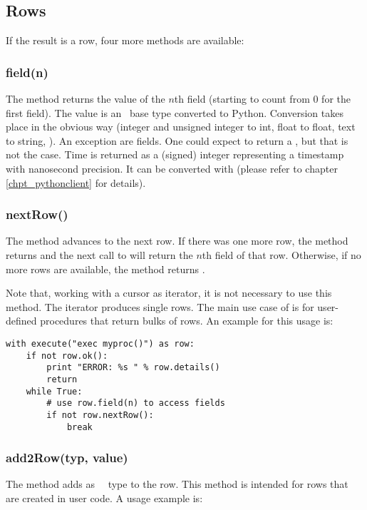 \subsection{Rows}
If the result is a row,
four more methods are available:

\subsubsection{field(n)}
The method returns the value
of the $n$th field (starting to count
from 0 for the first field).
The value is an \sql\ base type
converted to Python.
Conversion takes place in the obvious way
(integer and unsigned integer to int,
 float to float, text to string, \etc).
An exception are  fields.
One could expect  to return
a , but that is not the case.
Time is returned as a (signed) integer
representing a  timestamp
with nanosecond precision.
It can be converted with 
(please refer to chapter \ref{chpt_pythonclient}
for details).

\subsubsection{nextRow()}
The method advances to the next row.
If there was one more row, the method
returns  and the next call
to  will return the
$n$th field of that row.
Otherwise, if no more rows are available,
the method returns .

Note that, working with a cursor
as iterator, it is not necessary
to use this method. The iterator
produces single rows.
The main use case of 
is for user-defined procedures that
return bulks of rows. An example
for this usage is:

\begin{python}
\begin{lstlisting}
with execute("exec myproc()") as row:
    if not row.ok():
        print "ERROR: %s " % row.details()
        return
    while True:
        # use row.field(n) to access fields
        if not row.nextRow():
            break
\end{lstlisting}
\end{python}

\subsubsection{add2Row(typ, value)}
The method adds 
as \nowdb\ \sql\ type  to
the row. This method is intended
for rows that are created in user code.
A usage example is:

